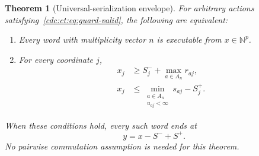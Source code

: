 \documentclass[11pt,a4paper]{article}
\newtheorem{theorem}{Theorem}[section]
\theoremstyle{definition}
\theoremstyle{remark}
\newcommand{\N}{\mathbb N}
\begin{document}
\begin{theorem}[Universal-serialization envelope]\label{cdc:ct:thm:envelope}
For arbitrary actions satisfying~\eqref{cdc:ct:eq:guard-valid}, the following are equivalent:
\begin{enumerate}[label=(\roman*)]
\item Every word with multiplicity vector $n$ is executable from $x\in\N^p$.
\item For every coordinate $j$,
\begin{align}
 x_j&\ge S_j^-+\max_{a\in A_n}r_{aj},\label{cdc:ct:eq:envelope-lower}\\
 x_j&\le \min_{\substack{a\in A_n\\u_{aj}<\infty}}s_{aj}-S_j^+.
 \label{cdc:ct:eq:envelope-upper}
\end{align}
\end{enumerate}
When these conditions hold, every such word ends at
\begin{equation}\label{cdc:ct:eq:envelope-output}
 y=x-S^-+S^+.
\end{equation}
No pairwise commutation assumption is needed for this theorem.
\end{theorem}
\end{document}
